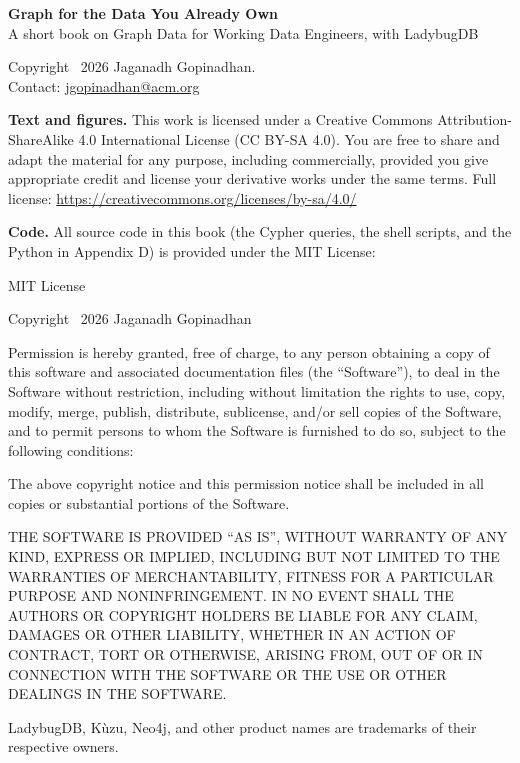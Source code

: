 \thispagestyle{empty}
\vspace*{1.4cm}
{\small\sffamily\setlength{\parindent}{0pt}\setlength{\parskip}{1.2ex}

\textbf{Graph for the Data You Already Own}\\
A short book on Graph Data for Working Data Engineers, with LadybugDB

Copyright \textcopyright\ 2026 Jaganadh Gopinadhan.\\
Contact: \href{mailto:jgopinadhan@acm.org}{jgopinadhan@acm.org}

\textbf{Text and figures.} This work is licensed under a Creative Commons
Attribution-ShareAlike 4.0 International License (CC BY-SA 4.0). You are free
to share and adapt the material for any purpose, including commercially,
provided you give appropriate credit and license your derivative works under
the same terms. Full license: \url{https://creativecommons.org/licenses/by-sa/4.0/}

\textbf{Code.} All source code in this book (the Cypher queries, the shell
scripts, and the Python in Appendix D) is provided under the MIT License:

{\footnotesize
MIT License

Copyright \textcopyright\ 2026 Jaganadh Gopinadhan

Permission is hereby granted, free of charge, to any person obtaining a copy of
this software and associated documentation files (the ``Software''), to deal in
the Software without restriction, including without limitation the rights to
use, copy, modify, merge, publish, distribute, sublicense, and/or sell copies of
the Software, and to permit persons to whom the Software is furnished to do so,
subject to the following conditions:

The above copyright notice and this permission notice shall be included in all
copies or substantial portions of the Software.

THE SOFTWARE IS PROVIDED ``AS IS'', WITHOUT WARRANTY OF ANY KIND, EXPRESS OR
IMPLIED, INCLUDING BUT NOT LIMITED TO THE WARRANTIES OF MERCHANTABILITY, FITNESS
FOR A PARTICULAR PURPOSE AND NONINFRINGEMENT. IN NO EVENT SHALL THE AUTHORS OR
COPYRIGHT HOLDERS BE LIABLE FOR ANY CLAIM, DAMAGES OR OTHER LIABILITY, WHETHER IN
AN ACTION OF CONTRACT, TORT OR OTHERWISE, ARISING FROM, OUT OF OR IN CONNECTION
WITH THE SOFTWARE OR THE USE OR OTHER DEALINGS IN THE SOFTWARE.\par}

LadybugDB, Kùzu, Neo4j, and other product names are trademarks of their
respective owners.
\par}
\clearpage
